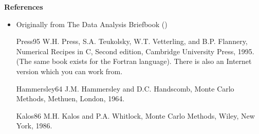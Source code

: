 \documentclass[12pt]{article}
\begin{document}
{\bf References}

\begin{itemize}
\item Originally from The Data Analysis Briefbook
()
\end{itemize}

\begin{itemize}
\item [Press95] W.H. Press, S.A. Teukolsky, W.T. Vetterling, and B.P. Flannery, Numerical Recipes in C, Second edition, Cambridge University Press, 1995. (The same book exists for the Fortran language). There is also an Internet version which you can work from.
\item[Hammersley64] J.M. Hammersley and D.C. Handscomb, Monte Carlo Methods, Methuen, London, 1964.
\item[Kalos86] M.H. Kalos and P.A. Whitlock, Monte Carlo Methods, Wiley, New York, 1986.
\end{itemize}
\end{document}

